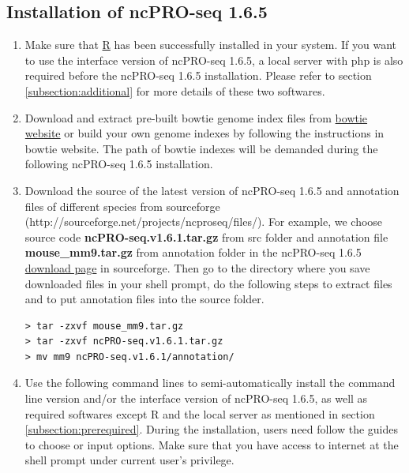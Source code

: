 \documentclass[12pt]{article}
\def \ncpip{ncPRO-seq 1.6.5}
\begin{document}
\noindent
\subsection{Installation of \ncpip{}}
\begin{enumerate}
 \item Make sure that \href{http://www.r-project.org/}{ R} has been successfully installed in your system. If you want to use the interface version of \ncpip{}, a local server with php is also required before the \ncpip{} installation. Please refer to section \ref{subsection:additional} for more details of these two softwares.
 \item Download and extract pre-built bowtie genome index files from \href{ftp://ftp.cbcb.umd.edu/pub/data/bowtie_indexes/}{ bowtie website} or build your own genome indexes by following the instructions in bowtie website. The path of bowtie indexes will be demanded during the following \ncpip{} installation.
 \item Download the source of the latest version of \ncpip{} and annotation files of different species from sourceforge (http://sourceforge.net/projects/ncproseq/files/). For example, we choose source code \textbf{ncPRO-seq.v1.6.1.tar.gz} from src folder and annotation file \textbf{mouse\_mm9.tar.gz} from annotation folder in the \ncpip{} \href{http://sourceforge.net/projects/ncproseq/files/}{ download page} in sourceforge. Then go to the directory where you save downloaded files in your shell prompt, do the following steps to extract files and to put annotation files into the source folder.\\
\begin{verbatim}
> tar -zxvf mouse_mm9.tar.gz
> tar -zxvf ncPRO-seq.v1.6.1.tar.gz
> mv mm9 ncPRO-seq.v1.6.1/annotation/
\end{verbatim}
 \item Use the following command lines to semi-automatically install the command line version and/or the interface version of \ncpip{}, as well as required softwares except R and the local server as mentioned in section \ref{subsection:prerequired}. During the installation, users need follow the guides to choose or input options. Make sure that you have access to internet at the shell prompt under current user's privilege.


\end{enumerate}
\end{document}
